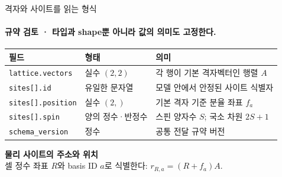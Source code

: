 \begin{frame}[label=site-schema]{격자와 사이트를 읽는 형식}
  \framesubtitle{규약 검토 · 타입과 shape뿐 아니라 값의 의미도 고정한다.}
  \begin{tabularx}{\textwidth}{@{}p{3.3cm}p{2.8cm}Y@{}}
    \toprule
    필드 & 형태 & 의미 \\
    \midrule
    \texttt{lattice.vectors} & 실수 $(2,2)$ & 각 행이 기본 격자벡터인 행렬 $A$ \\
    \texttt{sites[].id} & 유일한 문자열 & 모델 안에서 안정된 사이트 식별자 \\
    \texttt{sites[].position} & 실수 $(2,)$ & 기본 격자 기준 분율 좌표 $f_a$ \\
    \texttt{sites[].spin} & 양의 정수·반정수 & 스핀 양자수 $S$; 국소 차원 $2S+1$ \\
    \texttt{schema\_version} & 정수 & 공통 전달 규약 버전 \\
    \bottomrule
  \end{tabularx}
  \par\medskip
  \textbf{물리 사이트의 주소와 위치}\\[0.4em]
  셀 정수 좌표 $R$와 basis ID $a$로 식별한다: $r_{R,a}=(R+f_a)A$.\\[0.4em]
\end{frame}

